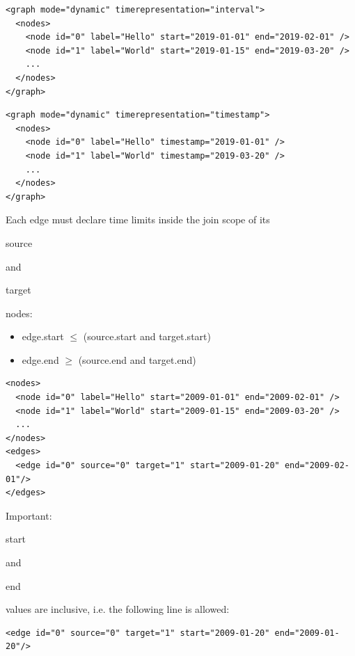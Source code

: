 \documentclass[a4paper,10pt]{article}
\begin{document}
\lstset{ style=gexf }
\begin{lstlisting}[caption={Node Scope Example with Intervals}]
<graph mode="dynamic" timerepresentation="interval">
  <nodes>
    <node id="0" label="Hello" start="2019-01-01" end="2019-02-01" />
    <node id="1" label="World" start="2019-01-15" end="2019-03-20" />
    ...
  </nodes>
</graph>
\end{lstlisting}

\lstset{ style=gexf }
\begin{lstlisting}[caption={Node Scope Example with Timestamps}]
<graph mode="dynamic" timerepresentation="timestamp">
  <nodes>
    <node id="0" label="Hello" timestamp="2019-01-01" />
    <node id="1" label="World" timestamp="2019-03-20" />
    ...
  </nodes>
</graph>
\end{lstlisting}

Each edge must declare time limits inside the join scope of its \begin{footnotesize}source\end{footnotesize} and \begin{footnotesize}target\end{footnotesize} nodes:
\begin{itemize}
 \item edge.start $\le$ (source.start and target.start)
 \item edge.end   $\ge$ (source.end   and target.end)
\end{itemize}

\lstset{ style=gexf }
\begin{lstlisting}[caption={Edge Scope Example}]
<nodes>
  <node id="0" label="Hello" start="2009-01-01" end="2009-02-01" />
  <node id="1" label="World" start="2009-01-15" end="2009-03-20" />
  ...
</nodes>
<edges>
  <edge id="0" source="0" target="1" start="2009-01-20" end="2009-02-01"/>
</edges>
\end{lstlisting}

Important: \begin{footnotesize}start\end{footnotesize} and \begin{footnotesize}end\end{footnotesize} values are inclusive, i.e. the following line is allowed:

\lstset{ style=gexf }
\begin{lstlisting}[caption={Smallest time scope}]
<edge id="0" source="0" target="1" start="2009-01-20" end="2009-01-20"/>
\end{lstlisting}
\end{document}
